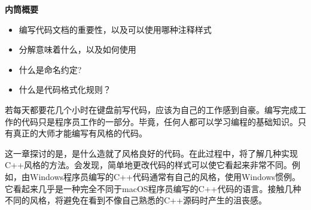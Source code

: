 \noindent
\textbf{内筒概要}

\begin{itemize}
\item
编写代码文档的重要性，以及可以使用哪种注释样式

\item
分解意味着什么，以及如何使用

\item
什么是命名约定?

\item
什么是代码格式化规则？
\end{itemize}

若每天都要花几个小时在键盘前写代码，应该为自己的工作感到自豪。编写完成工作的代码只是程序员工作的一部分。毕竟，任何人都可以学习编程的基础知识。只有真正的大师才能编写有风格的代码。

这一章探讨的是，是什么造就了风格良好的代码。在此过程中，将了解几种实现C++风格的方法。会发现，简单地更改代码的样式可以使它看起来非常不同。例如，由Windows程序员编写的C++代码通常有自己的风格，使用Windows惯例。它看起来几乎是一种完全不同于macOS程序员编写的C++代码的语言。接触几种不同的风格，将避免在看到不像自己熟悉的C++源码时产生的沮丧感。
